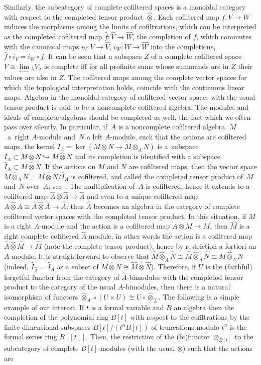 \documentclass[pdftex]{sigma}
\def\Ker{\operatorname{ker}}
\numberwithin{equation}{section}
\begin{document}
Similarly, the subcategory of complete cofiltered spaces is a monoidal category with respect to the completed tensor product $\hat\otimes$. Each cofiltered map $f\colon V\to W$ induces the morphisms among the limits of cofiltrations, which can be interpreted as the completed cofiltered map $\hat{f}\colon \hat{V}\to\hat{W}$, the completion of $f$, which commutes with the canonical maps $i_V\colon V\to\hat{V}$, $i_W\colon W\to\hat{W}$ into the completions, $\hat{f}\circ i_V = i_W\circ f$. It can be seen that a subspace $Z$ of a complete cofiltered space $V\cong\underset\longleftarrow\lim{}_\lambda V_\lambda$ is complete iff for all profinite sums whose summands are in $Z$ their values are also in $Z$. The cofiltered maps among the complete vector spaces for which the topological interpretation holds, coincide with the continuous linear maps. Algebra in the monoidal category of cofiltered vector spaces with the usual tensor product is said to be a noncomplete cofiltered algebra. The modules and ideals of complete algebras should be completed as well, the fact which we often pass over silently. In particular, if~$A$ is a noncomplete cofiltered algebra, $M$~a~right $A$-module and~$N$ a left $A$-module, such that the actions are cofiltered maps, the kernel $I_A = \Ker(M\otimes N\to M\otimes_A N)$ is a~subspace $I_A\subset M\otimes N\hookrightarrow M\hat\otimes N$ and its completion is identified with a subspace $\hat{I}_A\subset M\hat\otimes N$. If the actions on $M$ and $N$ are cofiltered maps, then the vector space $M\hat\otimes_A N = M\hat\otimes N/\hat{I}_A$ is cofiltered, and called the completed tensor product of~$M$ and~$N$ over~$A$, see~\cite{stojicPhD}. The multiplication of~$A$ is cofiltered, hence it extends to a cofiltered map $\hat{A}\otimes\hat{A}\to\hat{A}$ and even to a unique cofiltered map $A\hat\otimes A\cong \hat{A}\hat\otimes\hat{A}\to\hat{A}$; thus $\hat{A}$ becomes an algebra in the category of complete cofiltered vector spaces with the completed tensor product. In this situation, if $M$ is a right $A$-module and the action is a cofiltered map $A\otimes M\to M$, then $\hat{M}$ is a right complete cofiltered $\hat{A}$-module, in other words the action is a cofiltered map $\hat{A}\hat\otimes\hat{M}\to\hat{M}$ (note the complete tensor product), hence by restriction a fortiori an $A$-module. It is straightforward to observe that $\hat{M}\hat\otimes_{\hat{A}}\hat{N}\cong\hat{M}\hat\otimes_A\hat{N}\cong M\hat\otimes_A N$ (indeed, $\hat{I}_{\hat{A}} = \hat{I}_A$ as a subset of $M\hat\otimes N\cong\hat{M}\hat\otimes\hat{N}$). Therefore, if $U$ is the (faithful) forgetful functor from the category of $\hat{A}$-bimodules with the completed tensor product to the category of the usual $A$-bimodules, then there is a natural isomorphism of functors $\hat\otimes_A \circ (U\times U)\cong U\circ \hat\otimes_{\hat{A}}$. The following is a simple example of our interest. If $t$ is a formal variable and $B$ an algebra then the completion of the polynomial ring $B[t]$ with respect to the cofiltrations by the finite dimensional subspaces $B[t]/(t^n B[t])$ of truncations modulo $t^n$ is the formal series ring $B[[t]]$. Then, the restriction of the (bi)functor $\otimes_{B[t]}$ to the subcategory of complete $B[t]$-modules (with the usual $\otimes$) such that the actions are 
\end{document}
